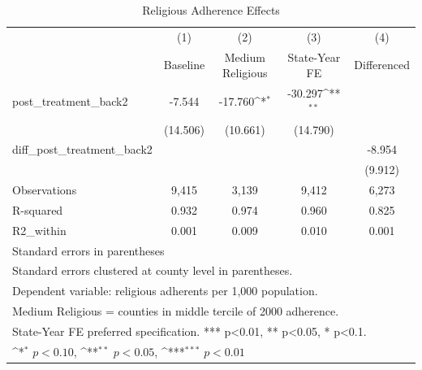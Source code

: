 \begin{table}[htbp]\centering
\def\sym#1{\ifmmode^{#1}\else\(^{#1}\)\fi}
\caption{Religious Adherence Effects}
\begin{tabular}{l*{4}{c}}
\hline\hline
            &\multicolumn{1}{c}{(1)}&\multicolumn{1}{c}{(2)}&\multicolumn{1}{c}{(3)}&\multicolumn{1}{c}{(4)}\\
            &\multicolumn{1}{c}{Baseline}&\multicolumn{1}{c}{Medium Religious}&\multicolumn{1}{c}{State-Year FE}&\multicolumn{1}{c}{Differenced}\\
\hline
post\_treatment\_back2&      -7.544         &     -17.760\sym{*}  &     -30.297\sym{**} &                     \\
            &    (14.506)         &    (10.661)         &    (14.790)         &                     \\
[1em]
diff\_post\_treatment\_back2&                     &                     &                     &      -8.954         \\
            &                     &                     &                     &     (9.912)         \\
\hline
Observations&       9,415         &       3,139         &       9,412         &       6,273         \\
R-squared   &       0.932         &       0.974         &       0.960         &       0.825         \\
R2\_within   &       0.001         &       0.009         &       0.010         &       0.001         \\
\hline\hline
\multicolumn{5}{l}{\footnotesize Standard errors in parentheses}\\
\multicolumn{5}{l}{\footnotesize Standard errors clustered at county level in parentheses.}\\
\multicolumn{5}{l}{\footnotesize Dependent variable: religious adherents per 1,000 population.}\\
\multicolumn{5}{l}{\footnotesize Medium Religious = counties in middle tercile of 2000 adherence.}\\
\multicolumn{5}{l}{\footnotesize State-Year FE preferred specification. *** p<0.01, ** p<0.05, * p<0.1.}\\
\multicolumn{5}{l}{\footnotesize \sym{*} \(p<0.10\), \sym{**} \(p<0.05\), \sym{***} \(p<0.01\)}\\
\end{tabular}
\end{table}
